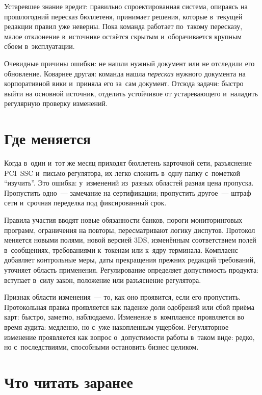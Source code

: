 
\label{ch:change-tracking}

Устаревшее знание вредит: правильно спроектированная система, опираясь на
прошлогодний пересказ бюллетеня, принимает решения, которые в~текущей редакции
правил уже неверны. Пока команда работает по~такому пересказу, малое
отклонение в~источнике остаётся скрытым и~оборачивается крупным сбоем
в~эксплуатации.

Очевидные причины ошибки: не нашли нужный документ или
не отследили его обновление. Коварнее другая: команда нашла \textit{пересказ}
нужного документа на корпоративной вики и~приняла его за~сам документ. Отсюда
задачи: быстро выйти на основной источник, отделить устойчивое от устаревающего
и~наладить регулярную проверку изменений.

\section*{Где меняется}\label{sec:ps-tracking-layers}

Когда в~один и~тот же месяц приходят бюллетень карточной сети, разъяснение
PCI~SSC и~письмо регулятора, их легко сложить в~одну папку с~пометкой
\enquote{изучить}. Это ошибка: у~изменений из~разных областей разная цена
пропуска. Пропустить одно~--- замечание на сертификации; пропустить другое~---
штраф сети и~срочная переделка под фиксированный срок.

Правила участия вводят новые обязанности банков, пороги мониторинговых
программ, ограничения на повторы, пересматривают логику диспутов. Протокол
меняется новыми полями, новой версией 3DS, изменённым соответствием полей в~сообщениях,
требованиями к~токенам или к~ядру терминала. Комплаенс добавляет контрольные
меры, даты прекращения прежних редакций требований, уточняет область применения.
Регулирование определяет допустимость продукта: вступает в~силу закон, положение
или разъяснение регулятора.

Признак области изменения~--- то, как оно проявится, если его пропустить.
Протокольная правка проявляется как падение доли одобрений или сбой приёма
карт: быстро, заметно, наблюдаемо. Изменение в~комплаенсе проявляется во время
аудита: медленно, но с~уже накопленным ущербом. Регуляторное изменение
проявляется как вопрос о~допустимости работы в~таком виде: редко, но
с~последствиями, способными остановить бизнес целиком.

\section*{Что читать заранее}\label{sec:ps-tracking-bulletins}

